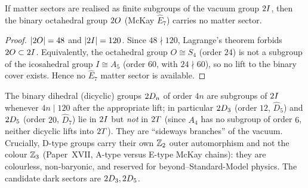 

\begin{theorem}
\label{P21:thm:noE7}
If matter sectors are realised as finite subgroups of the vacuum group
$2I$, then the binary octahedral group $2O$ (McKay $\widehat{E}_7$)
carries no matter sector.
\end{theorem}
\begin{proof}
$|2O|=48$ and $|2I|=120$. Since $48\nmid120$, Lagrange's theorem
forbids $2O\subset2I$. Equivalently, the octahedral group
$O\cong S_4$ (order $24$) is not a subgroup of the icosahedral group
$I\cong A_5$ (order $60$, with $24\nmid60$), so no lift to the binary
cover exists. Hence no $\widehat{E}_7$ matter sector is available.
\end{proof}

\begin{remark}
\label{P21:rem:dtype_slot}
The binary dihedral (dicyclic) groups $2D_n$ of order $4n$ are
subgroups of $2I$ whenever $4n\mid120$ after the appropriate lift;
in particular $2D_3$ (order $12$, $\widehat{D}_5$) and $2D_5$
(order $20$, $\widehat{D}_7$) lie in $2I$ but \emph{not} in $2T$
(since $A_4$ has no subgroup of order $6$, neither dicyclic lifts into
$2T$). They are ``sideways branches'' of the vacuum. Crucially,
D-type groups carry their own $\mathbb{Z}_2$ outer automorphism and not the
colour $\mathbb{Z}_3$ (Paper~XVII, A-type versus E-type McKay chains): they
are colourless, non-baryonic, and reserved for beyond--Standard-Model
physics. The candidate dark sectors are $2D_3,2D_5$.
\end{remark}

